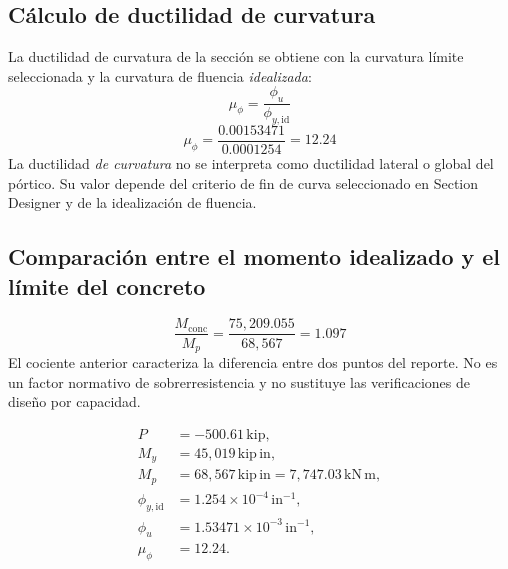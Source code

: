 \documentclass[11pt,a4paper]{article}
\begin{document}
\subsection{Cálculo de ductilidad de curvatura}
La ductilidad de curvatura de la sección se obtiene con la curvatura
límite seleccionada y la curvatura de fluencia \emph{idealizada}:
\begin{equation*}
\mu_{\phi}=\frac{\phi_{u}}{\phi_{y,\mathrm{id}}}
\end{equation*}
\begin{equation*}
\mu_{\phi}=\frac{0.00153471}{0.0001254}
=\boxed{12.24}
\end{equation*}
La ductilidad \emph{de curvatura} no se interpreta como ductilidad
lateral o global del pórtico. Su valor depende del criterio de fin de
curva seleccionado en Section Designer y de la idealización de fluencia.

\subsection{Comparación entre el momento idealizado y el límite del concreto}
\begin{equation*}
\frac{M_{\mathrm{conc}}}{M_p}
=\frac{75{,}209.055}{68{,}567}
=\boxed{1.097}
\end{equation*}
El cociente anterior caracteriza la diferencia entre dos puntos del
reporte. No es un factor normativo de sobrerresistencia y no sustituye
las verificaciones de diseño por capacidad.

\begin{tcolorbox}[title={Resultados consolidados de la fase 3}]
\begin{align*}
P&=-500.61\,\mathrm{kip},\\
M_y&=45{,}019\,\mathrm{kip\,in},\\
M_p&=\boxed{68{,}567\,\mathrm{kip\,in}}
     =\boxed{7{,}747.03\,\mathrm{kN\,m}},\\
\phi_{y,\mathrm{id}}&=1.254\times10^{-4}\,\mathrm{in}^{-1},\\
\phi_u&=1.53471\times10^{-3}\,\mathrm{in}^{-1},\\
\mu_{\phi}&=\boxed{12.24}.
\end{align*}
\end{tcolorbox}






\clearpage
\begin{landscape}


\end{landscape}
\clearpage
\end{document}
